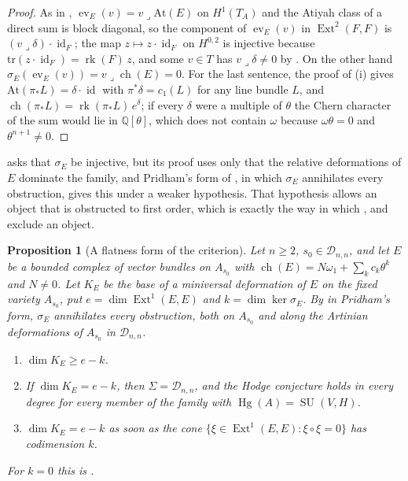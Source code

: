 \documentclass[11pt,reqno]{amsart}
\theoremstyle{plain}
\newtheorem{proposition}[theorem]{Proposition}
\theoremstyle{definition}
\theoremstyle{remark}
\newcommand{\QQ}{\mathbb{Q}}
\newcommand{\cD}{\mathcal{D}}
\DeclareMathOperator{\ch}{ch}
\DeclareMathOperator{\rk}{rk}
\DeclareMathOperator{\Ext}{Ext}
\DeclareMathOperator{\Hg}{Hg}
\DeclareMathOperator{\id}{id}
\DeclareMathOperator{\SU}{SU}
\begin{document}
\begin{proof}
As in \cite[Theorem~9.20]{paperI}, $\operatorname{ev}_{E}(v)=v\lrcorner\mathrm{At}(E)$
on $H^{1}(T_{A})$ and the Atiyah class of a direct sum is block diagonal, so
the component of $\operatorname{ev}_{E}(v)$ in $\Ext^{2}(F,F)$ is
$(v\lrcorner\delta)\cdot\id_{F}$; the map $z\mapsto z\cdot\id_{F}$ on
$H^{0,2}$ is injective because $\mathrm{tr}(z\cdot\id_{F})=\rk(F)\,z$, and
some $v\in T$ has $v\lrcorner\delta\ne0$ by \cite[Proposition~9.15(i)]{paperI}. On the
other hand $\sigma_{E}(\operatorname{ev}_{E}(v))=v\lrcorner\ch(E)=0$. For the
last sentence, the proof of (i) gives
$\mathrm{At}(\pi_{*}L)=\delta\cdot\id$ with $\pi^{*}\delta=c_{1}(L)$ for any
line bundle $L$, and $\ch(\pi_{*}L)=\rk(\pi_{*}L)\,e^{\delta}$; if every
$\delta$ were a multiple of $\theta$ the Chern character of the sum would lie
in $\QQ[\theta]$, which does not contain $\omega$ because $\omega\theta=0$ and
$\theta^{n+1}\ne0$.
\end{proof}

 asks that $\sigma_{E}$ be injective, but its proof
uses only that the relative deformations of $E$ dominate the family, and
Pridham's form of , in which $\sigma_{E}$ annihilates every
obstruction, gives this under a weaker hypothesis. That hypothesis allows an
object that is obstructed to first order, which is exactly the way in which
\cite[Theorem~9.20]{paperI},  and  exclude
an object.

\begin{proposition}[A flatness form of the criterion]\label{prop:p2flat}
Let $n\ge2$, $s_{0}\in\cD_{n,n}$, and let $E$ be a bounded complex of vector
bundles on $A_{s_{0}}$ with $\ch(E)=N\omega_{1}+\sum_{k}c_{k}\theta^{k}$ and
$N\ne0$. Let $K_{E}$ be the base of a miniversal deformation of $E$ on the
fixed variety $A_{s_{0}}$, put $e=\dim\Ext^{1}(E,E)$ and
$k=\dim\ker\sigma_{E}$. By  in Pridham's form, $\sigma_{E}$
annihilates every obstruction, both on $A_{s_{0}}$ and along the Artinian
deformations of $A_{s_{0}}$ in $\cD_{n,n}$.
\begin{enumerate}[label=\textup{(\roman*)},leftmargin=2.6em,itemsep=2pt]
\item $\dim K_{E}\ge e-k$.
\item If $\dim K_{E}=e-k$, then $\Sigma=\cD_{n,n}$, and the Hodge conjecture
  holds in every degree for every member of the family with
  $\Hg(A)=\SU(V,H)$.
\item $\dim K_{E}=e-k$ as soon as the cone
  $\{\xi\in\Ext^{1}(E,E):\xi\circ\xi=0\}$ has codimension $k$.
\end{enumerate}
For $k=0$ this is .
\end{proposition}
\end{document}
